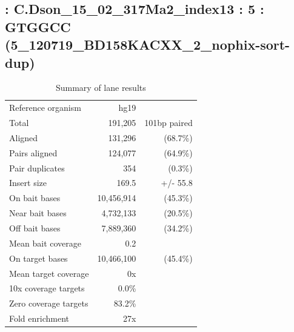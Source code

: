 \documentclass{article}
\begin{document}
    
\subsection*{ : C.Dson\_15\_02\_317Ma2\_index13 : 5 : GTGGCC (5\_120719\_BD158KACXX\_2\_nophix-sort-dup)}

    \begin{table}[h]
    \centering
    \begin{tabular}{|l|rr|}
    \hline
            Reference organism & hg19 &  \\ 
            Total & 191,205 & 101bp paired \\ 
            Aligned & 131,296 & (68.7\%) \\ 
            Pairs aligned & 124,077 & (64.9\%) \\ 
            Pair duplicates & 354 & (0.3\%) \\ 
            Insert size & 169.5 & +/- 55.8 \\ 
            \hline
            On bait bases & 10,456,914 & (45.3\%) \\ 
            Near bait bases & 4,732,133 & (20.5\%) \\ 
            Off bait bases & 7,889,360 & (34.2\%) \\ 
            Mean bait coverage & 0.2 &  \\ 
            On target bases & 10,466,100 & (45.4\%) \\ 
            Mean target coverage & 0x &  \\ 
            10x coverage targets & 0.0\% &  \\ 
            Zero coverage targets & 83.2\% &  \\ 
            Fold enrichment & 27x &  \\ 
    \hline
    \end{tabular}
    \caption{Summary of lane results}
    \end{table}
\end{document}
